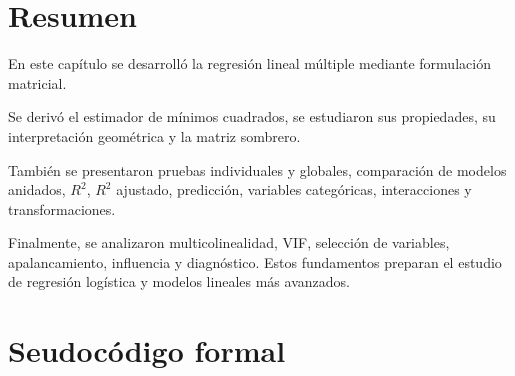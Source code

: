 \documentclass[
  spanish,
  10.5pt,
  letterpaper,
  DIV=11,
  numbers=noendperiod,
  oneside,
  open=any]{scrreprt}
\theoremstyle{definition}
\theoremstyle{definition}
\theoremstyle{plain}
\theoremstyle{remark}
\begin{document}
\section*{Resumen}\label{resumen-8}


En este capítulo se desarrolló la regresión lineal múltiple mediante
formulación matricial.

Se derivó el estimador de mínimos cuadrados, se estudiaron sus
propiedades, su interpretación geométrica y la matriz sombrero.

También se presentaron pruebas individuales y globales, comparación de
modelos anidados, \(R^2\), \(R^2\) ajustado, predicción, variables
categóricas, interacciones y transformaciones.

Finalmente, se analizaron multicolinealidad, VIF, selección de
variables, apalancamiento, influencia y diagnóstico. Estos fundamentos
preparan el estudio de regresión logística y modelos lineales más
avanzados.

\section*{Seudocódigo formal}\label{seudocuxf3digo-formal-1}

\end{document}
